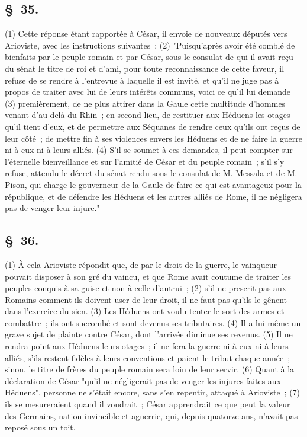 \documentclass[french,twoside]{book} %
\begin{document}
\subsection[{§ 35.}]{ \textsc{§ 35.} }
\noindent (1) Cette réponse étant rapportée à César, il envoie de nouveaux députés vers Arioviste, avec les instructions suivantes : (2) "Puisqu’après avoir été comblé de bienfaits par le peuple romain et par César, sous le consulat de qui il avait reçu du sénat le titre de roi et d’ami, pour toute reconnaissance de cette faveur, il refuse de se rendre à l’entrevue à laquelle il est invité, et qu’il ne juge pas à propos de traiter avec lui de leurs intérêts communs, voici ce qu’il lui demande (3) premièrement, de ne plus attirer dans la Gaule cette multitude d’hommes venant d’au-delà du Rhin ; en second lieu, de restituer aux Héduens les otages qu’il tient d’eux, et de permettre aux Séquanes de rendre ceux qu’ils ont reçus de leur côté ; de mettre fin à ses violences envers les Héduens et de ne faire la guerre ni à eux ni à leurs alliés. (4) S'il se soumet à ces demandes, il peut compter sur l’éternelle bienveillance et sur l’amitié de César et du peuple romain ; s’il s’y refuse, attendu le décret du sénat rendu sous le consulat de M. Messala et de M. Pison, qui charge le gouverneur de la Gaule de faire ce qui est avantageux pour la république, et de défendre les Héduens et les autres alliés de Rome, il ne négligera pas de venger leur injure."
\subsection[{§ 36.}]{ \textsc{§ 36.} }
\noindent (1) À cela Arioviste répondit que, de par le droit de la guerre, le vainqueur pouvait disposer à son gré du vaincu, et que Rome avait coutume de traiter les peuples conquis à sa guise et non à celle d’autrui ; (2) s’il ne prescrit pas aux Romains comment ils doivent user de leur droit, il ne faut pas qu’ils le gênent dans l’exercice du sien. (3) Les Héduens ont voulu tenter le sort des armes et combattre ; ils ont succombé et sont devenus ses tributaires. (4) Il a lui-même un grave sujet de plainte contre César, dont l’arrivée diminue ses revenus. (5) Il ne rendra point aux Héduens leurs otages ; il ne fera la guerre ni à eux ni à leurs alliés, s’ils restent fidèles à leurs conventions et paient le tribut chaque année ; sinon, le titre de frères du peuple romain sera loin de leur servir. (6) Quant à la déclaration de César "qu’il ne négligerait pas de venger les injures faites aux Héduens", personne ne s’était encore, sans s’en repentir, attaqué à Arioviste ; (7) ils se mesureraient quand il voudrait ; César apprendrait ce que peut la valeur des Germains, nation invincible et aguerrie, qui, depuis quatorze ans, n’avait pas reposé sous un toit.
\end{document}
